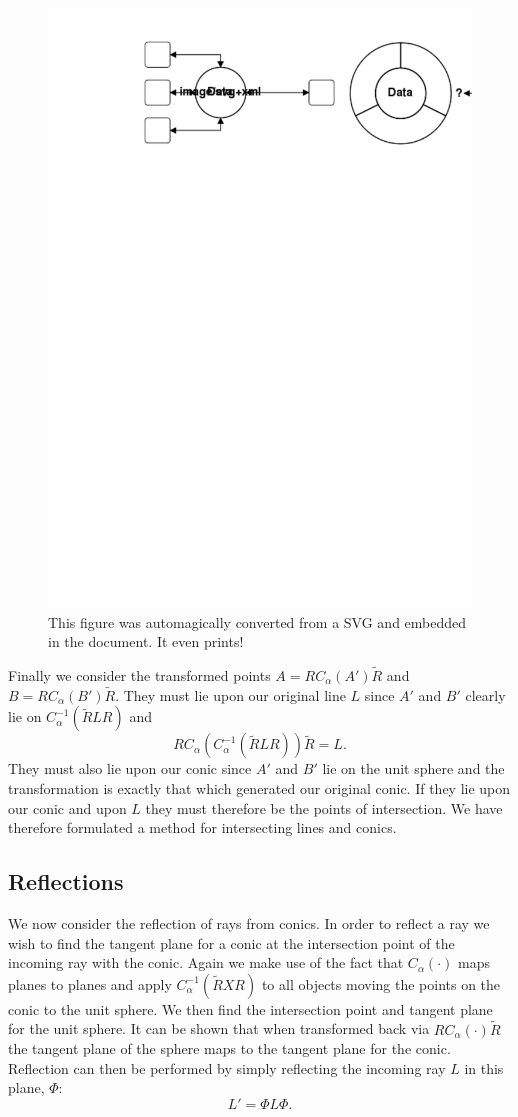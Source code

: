 \begin{figure}[t]\centering
\includegraphics[width=0.8\columnwidth]{objcobject}
\caption{\label{fig:conic_transform}This figure was automagically converted from a
SVG and embedded in the document. It even prints!}
\end{figure}

Finally we consider the transformed points $A = RC_\alpha(A')\tilde{R}$
and
$B = RC_\alpha(B')\tilde{R}$. They must lie upon our original line 
$L$ since
$A'$ and $B'$ clearly lie on $C_\alpha^{-1}(\tilde{R}LR)$ and 
\[ RC_\alpha(C_\alpha^{-1}(\tilde{R}LR))\tilde{R} = L. \]
They must also lie upon our conic since $A'$ and $B'$ lie on the unit sphere
and the transformation is exactly that which generated our original conic.
If they lie upon our conic and upon $L$ they must therefore be the points
of intersection.
We have therefore formulated a method for intersecting lines and conics. 

\subsection{Reflections}
\label{sec:Ref}
We now consider the reflection of rays from conics. In order to
reflect a ray we wish to find the tangent plane for a conic at the 
intersection point of the incoming ray with the conic. Again we
make use of the fact that $C_\alpha(\cdot)$ maps planes to
planes and apply $C_\alpha^{-1}(\tilde{R}XR)$ to all objects moving the
points on the conic to the unit sphere. We then find the intersection
point and tangent plane for the unit sphere. It can be shown \cite{jic23fyr}
that when transformed back via $RC_\alpha(\cdot)\tilde{R}$ the tangent
plane of the sphere maps to the tangent plane for the conic. Reflection
can then be performed by simply reflecting the incoming ray $L$ in
this plane, $\Phi$:
\[
L' = \Phi L \Phi.
\]
